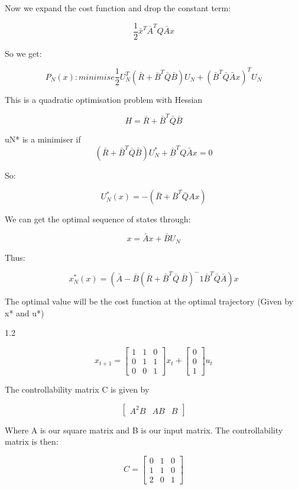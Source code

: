 \documentclass{article}
\begin{document}
Now we expand the cost function and drop the constant term:

\[ \frac{1}{2} \bar{x}^T \bar{A}^TQ\bar{A}x \]

So we get:

\[ P_N(x) : minimise \frac{1}{2} U_N^T (\bar{R} + \bar{B}^T\bar{Q}\bar{B})U_N + (\bar{B}^T\bar{Q}\bar{A}x)^TU_N \]

 This is a quadratic optimisation problem with Hessian 
 
 \[  H  = \bar{R} + \bar{B}^T\bar{Q}\bar{B} \]
 
 uN*  is a minimiser if \[ ( \bar{R} + \bar{B}^T\bar{Q}\bar{B} ) U_N^* + \bar{B}^TQ\bar{A}x = 0 \]
 
 So:
 
 \[ U_N^* (x) = - (\bar{R} + \bar{B}^T\bar{Q}Ax) \]

We can get the optimal sequence of states through:

\[ x = \bar{A} x+ \bar{B}U_N \]

 Thus:
 
 \[ x_N^* (x) = (\bar{A} - \bar{B} (\bar{R} + \bar{B}^T\bar{Q}\ \bar{B})^-1 \bar{B}^T\bar{Q}\bar{A})x \]
 
 The optimal value will be the cost function at the optimal trajectory (Given by x* and u*)

 
 
 1.2 
 
\[ x_{t+1} = \begin{bmatrix}
1 & 1 & 0 \\
0 & 1 & 1 \\
0 & 0 & 1
\end{bmatrix} x_t+ 
\begin{bmatrix} 0 \\
0 \\
1 \end{bmatrix} u_t
 \]
 
 The controllability matrix C is given by
 
\[ \begin{bmatrix}
A^2B & AB & B
\end{bmatrix} \] 
 
 Where A is our square matrix and B is our input matrix. The controllability matrix is then:
 
 \[ C = \begin{bmatrix}
 0 & 1 & 0 \\
 1 & 1 & 0 \\
 2 & 0 & 1 \end{bmatrix}
 \] 
 
\end{document}

